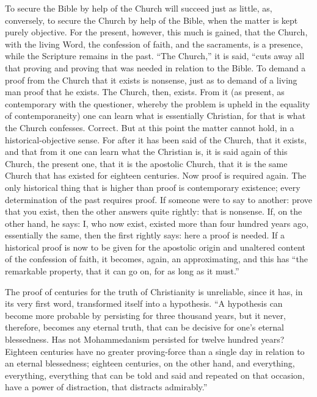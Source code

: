 \documentclass[12pt]{book}
\begin{document}
To secure the Bible by help of the Church will succeed just as little, as, conversely, to secure the Church by help of the Bible, when the matter is kept purely objective. For the present, however, this much is gained, that the Church, with the living Word, the confession of faith, and the sacraments, is a presence, while the Scripture remains in the past. ``The Church,'' it is said, ``cuts away all that proving and proving
that was needed in relation to the Bible. To demand a proof from the Church that it exists is nonsense, just as to demand of a living man proof that he exists. The Church, then, exists. From it (as present, as contemporary with the questioner, whereby the problem is upheld in the equality of contemporaneity) one can learn what is essentially Christian, for that is what the Church confesses. Correct. But at this point the matter cannot hold, in a historical-objective sense. For after it has been said of the Church, that it exists, and that from it one can learn what the Christian is, it is said again of this Church, the present one, that it is the apostolic Church, that it is the same Church that has existed for eighteen centuries. Now proof is required again. The only historical thing that is higher than proof is contemporary existence; every determination of the past requires proof. If someone were to say to another: prove that you exist, then
the other answers quite rightly: that is nonsense. If, on the other hand, he says: I, who now exist, existed more than four hundred years ago, essentially the same, then the first rightly says: here a proof is needed. If a historical proof is now to be given for the apostolic origin and unaltered content of the confession of faith, it becomes, again, an approximating, and this has ``the remarkable property, that it can go on, for as long as it must.''

The proof of centuries for the truth of Christianity is unreliable, since it has, in its very first word, transformed itself into a hypothesis. ``A hypothesis can become more probable by persisting for three thousand years, but it never, therefore, becomes any eternal truth, that can be decisive for one's eternal blessedness. Has not Mohammedanism persisted for twelve hundred years? Eighteen centuries have no greater proving-force than a single day in relation to an eternal blessedness; eighteen centuries, on the other hand, and everything, everything, everything that can be told and said and repeated on that occasion, have a power of distraction, that distracts admirably.''
\end{document}
